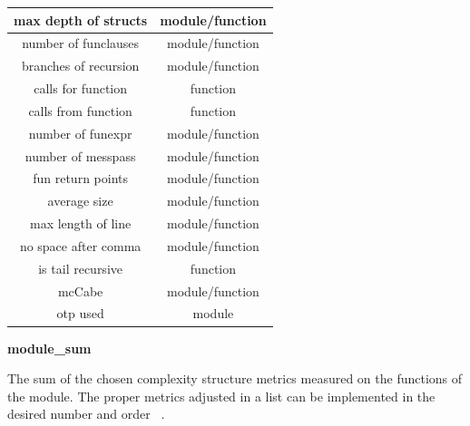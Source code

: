 \begin{table}[!htb]
{\begin{tabular}{|c|c|}
		  	\hline
		  	max depth of structs		& module/function		  			  
		  	\\		  			

		  	\hline
		  	number of funclauses		& module/function		  			  
		  	\\			
	
		  	\hline
		  	branches of recursion		& module/function		  			  
		  	\\			

		  	\hline
		  	calls for function			& function		  			  
		  	\\			
			
		  	\hline
		  	calls from function			& function		  			  
		  	\\	

		  	\hline
		  	number of funexpr			& module/function		  			  
		  	\\
		  	
		  	\hline
		  	number of messpass			& module/function		  			  
		  	\\		  	

		  	\hline
		  	fun return points			& module/function		  			  
		  	\\	
		  	
		  	\hline
		  	average size				& module/function		  			  
		  	\\		  		  	

		  	\hline
		  	max length of line			& module/function		  			  
		  	\\
		  	
		  	\hline
		  	no space after comma		& module/function		  			  
		  	\\	
		  	
		  	\hline
		  	is tail recursive			& function		  			  
		  	\\		  	

		  	\hline
		  	mcCabe						& module/function		  			  
		  	\\	
		  			  	
		  	\hline
		  	otp used						& module		  			  
		  	\\			  	
		  	\hline		  		  			  				
		\end{tabular}}
	\end{table}

\textbf{module\_sum}

The sum of the chosen complexity structure metrics measured on the functions of the module. The proper metrics adjusted in a list can be implemented in the desired number and order ~\cite{refactorerlm}.

